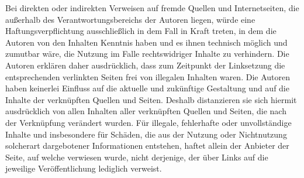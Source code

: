 Bei direkten oder indirekten Verweisen auf fremde Quellen und Internetseiten, die außerhalb des Verantwortungsbereichs der Autoren liegen, würde eine Haftungsverpflichtung ausschließlich in dem Fall in Kraft treten, in dem die Autoren von den Inhalten Kenntnis haben und es ihnen technisch möglich und zumutbar wäre, die Nutzung im Falle rechtswidriger Inhalte zu verhindern. Die Autoren erklären daher ausdrücklich, dass zum Zeitpunkt der Linksetzung die entsprechenden verlinkten Seiten frei von illegalen Inhalten waren. Die Autoren haben keinerlei Einfluss auf die aktuelle und zukünftige Gestaltung und auf die Inhalte der verknüpften Quellen und Seiten. Deshalb distanzieren sie sich hiermit ausdrücklich von allen Inhalten aller verknüpften Quellen und Seiten, die nach der Verknüpfung verändert wurden. Für illegale, fehlerhafte oder unvollständige Inhalte und insbesondere für Schäden, die aus der Nutzung oder Nichtnutzung solcherart dargebotener Informationen entstehen, haftet allein der Anbieter der Seite, auf welche verwiesen wurde, nicht derjenige, der über Links auf die jeweilige Veröffentlichung lediglich verweist.

